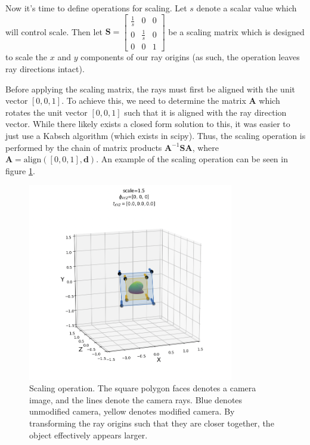 Now it's time to define operations for scaling. Let $s$ denote a scalar value which will control scale. Then let $\textbf{S} = \begin{bmatrix}\frac{1}{s} & 0 & 0 \\ 0 & \frac{1}{s} & 0 \\ 0 & 0 & 1\end{bmatrix}$ be a scaling matrix which is designed to scale the $x$ and $y$ components of our ray origins (as such, the operation leaves ray directions intact).

Before applying the scaling matrix, the rays must first be aligned with the unit vector $[0,0,1]$. To achieve this, we need to determine the matrix $\textbf{A}$ which rotates the unit vector $[0,0,1]$ such that it is aligned with the ray direction vector. While there likely exists a closed form solution to this, it was easier to just use a Kabsch algorithm (which exists in scipy). Thus, the scaling operation is performed by the chain of matrix products $\textbf{A}^{-1} \textbf{S} \textbf{A}$, where $\textbf{A} = \text{align}([0,0,1], \textbf{d})$. An example of the scaling operation can be seen in figure \ref{fig:manip-scale}.
\begin{figure}[H]
    \centering
    \includegraphics[width=0.8\textwidth]{figures/manip-scale.png}
    \caption{Scaling operation. The square polygon faces denotes a camera image, and the lines denote the camera rays. Blue denotes unmodified camera, yellow denotes modified camera. By transforming the ray origins such that they are closer together, the object effectively appears larger.}
    \label{fig:manip-scale}
\end{figure}

